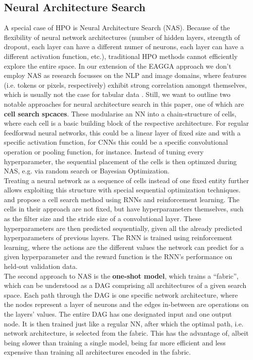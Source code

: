 \documentclass[twoside,11pt]{article}
\begin{document}
\subsection{Neural Architecture Search}
A special case of HPO is Neural Architecture Search (NAS). Because of the flexibility of neural network architectures (number of hidden layers, strength of dropout,
each layer can have a different numer of neurons, each layer can have a different activation function, etc.), traditional HPO methods cannot efficiently explore the
entire space.
In our extension of the EAGGA approach we don't employ NAS as research focusses on the NLP and image domains, %
where features (i.e. tokens or pixels, respectively) exhibit strong correlation amongst themselves, which is usually not the case for tabular data \citep[p. 7499]{Borisov_2024}.
Still, we want to outline two notable approaches for neural architecture search in this paper, one of which are \textbf{cell search spcaces}.
These modularise an NN into a chain-structure of cells, where each cell is a basic building block of the respective architecture. For regular feedforwad neural networks,
this could be a linear layer of fixed size and with a specific activation function,
for CNNs this could be a specific convolutional operation or pooling function, for instance.
Instead of tuning every hyperparameter, the sequential placement of the cells is then optimzed during NAS, e.g. via random search or Bayesian
Optimization. \citep[chap. 3.2]{elsken_neural_2019}
\\
Treating a neural network as a sequence of cells instead of one fixed entity further allows exploiting this structure with special sequential optimization techniques.
\citet[p. 3]{zoph2017neuralarchitecturesearchreinforcement} and \citet[pp. 2-4]{Zoph_2018_CVPR} propose a cell search method using RNNs and reinforcement learning.
The cells in their approach are not fixed, but have hyperparameters themselves, such as the filter size and the stride size of a convolutional layer.
These hyperparameters are then predicted sequentially, given all the already predicted hyperparameters of previous layers. The RNN is trained using reinforcement
learning, where the actions are the different values the network can predict for a given hyperparameter and the reward function is the RNN's performance on held-out
validation data.
\\
The second approach to NAS is the \textbf{one-shot model}, which trains a ``fabric'', which can be understood as a DAG comprising all architectures of a given
search space. Each path through the DAG is one specific network architecture, where the nodes represent a layer of neurons and the edges in-between are operations
on the layers' values. The entire DAG has one designated input and one output node.
It is then trained just like a regular NN, after which the optimal path, i.e. network architecture, is selected from the fabric.
This has the advantage of, albeit being slower than training a single model, being far more efficient and less expensive than training all architectures encoded
in the fabric. \citep[pp. 1-2, p.8]{saxena2017convolutionalneuralfabrics}
\end{document}
